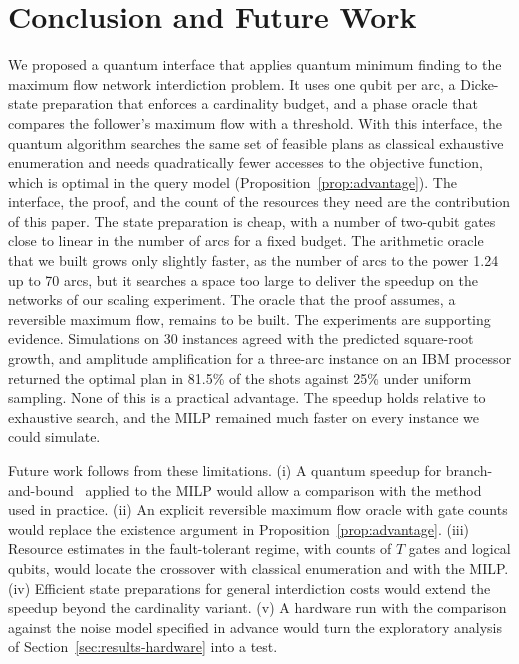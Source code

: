 \section{Conclusion and Future Work}\label{sec:conclusion}

We proposed a quantum interface that applies quantum minimum finding to the maximum flow network interdiction problem. It uses one qubit per arc, a Dicke-state preparation that enforces a cardinality budget, and a phase oracle that compares the follower's maximum flow with a threshold. With this interface, the quantum algorithm searches the same set of feasible plans as classical exhaustive enumeration and needs quadratically fewer accesses to the objective function, which is optimal in the query model (Proposition~\ref{prop:advantage}). The interface, the proof, and the count of the resources they need are the contribution of this paper. The state preparation is cheap, with a number of two-qubit gates close to linear in the number of arcs for a fixed budget. The arithmetic oracle that we built grows only slightly faster, as the number of arcs to the power 1.24 up to 70 arcs, but it searches a space too large to deliver the speedup on the networks of our scaling experiment. The oracle that the proof assumes, a reversible maximum flow, remains to be built. The experiments are supporting evidence. Simulations on 30 instances agreed with the predicted square-root growth, and amplitude amplification for a three-arc instance on an IBM processor returned the optimal plan in 81.5\% of the shots against 25\% under uniform sampling. None of this is a practical advantage. The speedup holds relative to exhaustive search, and the MILP remained much faster on every instance we could simulate.

Future work follows from these limitations. (i) A quantum speedup for branch-and-bound~\cite{montanaro2020} applied to the MILP would allow a comparison with the method used in practice. (ii) An explicit reversible maximum flow oracle with gate counts would replace the existence argument in Proposition~\ref{prop:advantage}. (iii) Resource estimates in the fault-tolerant regime, with counts of $T$ gates and logical qubits, would locate the crossover with classical enumeration and with the MILP. (iv) Efficient state preparations for general interdiction costs would extend the speedup beyond the cardinality variant. (v) A hardware run with the comparison against the noise model specified in advance would turn the exploratory analysis of Section~\ref{sec:results-hardware} into a test.
